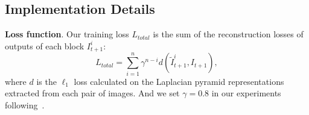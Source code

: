 \documentclass[10pt,twocolumn,letterpaper]{article}
\begin{document}
\begin{table*}[th]
\centering
\caption{
\textbf{Quantitative results on the DAVIS17-Val~\cite{davis} and Vimeo90K-Test~\cite{vimeo} benchmarks}. We denote DMVFN without routing as ``DMVFN~(w/o r)''. ``N/A'' means not available. }
\centering
{}
\label{table:davis-vimeo}
\end{table*}

\subsection{Implementation Details}
\label{sec:implement}

\noindent
\textbf{Loss function}. Our training loss ${L}_{total}$ is the sum of the reconstruction losses of outputs of each block ${I}^{i}_{t+1}$:
\begin{equation}\label{eq2}
     {L}_{total} = \sum_{i=1}^n \gamma^{n-i} d(\tilde{I}^{i}_{t+1}, I_{t+1}),
\end{equation}
where $d$ is the $\ell_1$ loss calculated on the Laplacian pyramid representations~\cite{laplacian} extracted from each pair of images. And we set $\gamma=0.8$ in our experiments following~\cite{raft}.
\end{document}
